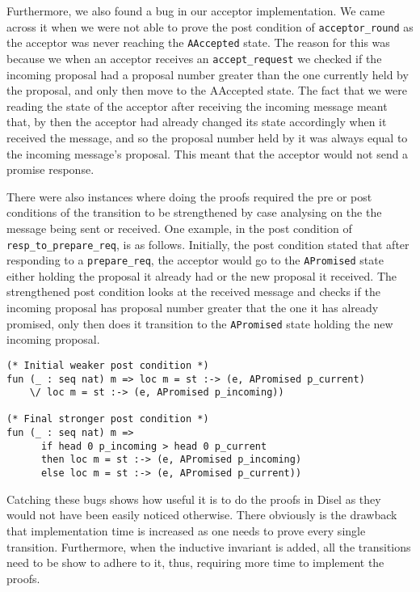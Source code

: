 Furthermore, we also found a bug in our acceptor implementation. We came
across it when we were not able to prove the post condition of \texttt{acceptor\_round}
as the acceptor was never reaching the \texttt{AAccepted} state.
The reason for this was because we when an acceptor receives an \texttt{accept\_request}
we checked if the incoming proposal had a proposal number greater than the one
currently held by the proposal, and only then move to the AAccepted state. The fact
that we were reading the state of the acceptor after receiving the incoming message
meant that, by then the acceptor had already changed its state accordingly
when it received the message, and so the proposal number held by it was always
equal to the incoming message's proposal. This meant that the acceptor would not
send a promise response.

There were also instances where doing the proofs required the pre
or post conditions of the transition to
be strengthened by case analysing on the the message being sent or received.
One example, in the post condition of \texttt{resp\_to\_prepare\_req}, is as
follows. Initially,
the post condition stated that after responding to a \texttt{prepare\_req},
the acceptor would go to the \texttt{APromised} state either holding the
proposal it already had or the new proposal it received. The strengthened
post condition
looks at the received message and checks if the incoming proposal has proposal
number greater that the one it has already promised, only then does it transition
to the \texttt{APromised} state holding the new incoming proposal.

\begin{lstlisting}
(* Initial weaker post condition *)
fun (_ : seq nat) m => loc m = st :-> (e, APromised p_current)
    \/ loc m = st :-> (e, APromised p_incoming))

(* Final stronger post condition *)
fun (_ : seq nat) m =>
      if head 0 p_incoming > head 0 p_current
      then loc m = st :-> (e, APromised p_incoming)
      else loc m = st :-> (e, APromised p_current))
\end{lstlisting}

Catching these bugs shows how useful it is to do the proofs in Disel as they
would not have been easily noticed otherwise.
There obviously is the drawback that implementation time is increased as one
needs to prove every single transition. Furthermore, when the inductive
invariant is added, all the transitions need to be show to adhere to it,
thus, requiring more time to implement the proofs.

